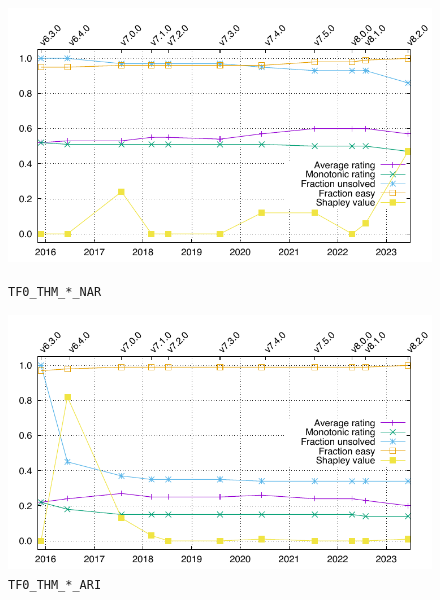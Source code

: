 \documentclass[runningheads]{llncs}
\begin{document}
\begin{figure}[ht!]
\centering
\begin{minipage}[t]{.49\textwidth}
  \centering
  \includegraphics[width=\textwidth]{Plots/GNUPlots/TF0_THM_NAR.pdf}
  \vspace*{-2em}
  \caption{{\tt TF0\_THM\_*\_NAR}}
  \label{Plot_TF0_THM_NAR}
\end{minipage}
\begin{minipage}[t]{.49\textwidth}
  \centering
  \includegraphics[width=\textwidth]{Plots/GNUPlots/TF0_THM_ARI.pdf}
  \vspace*{-2em}
  \caption{{\tt TF0\_THM\_*\_ARI}}
  \label{Plot_TF0_THM_ARI}
\end{minipage}
\end{figure}
\end{document}
